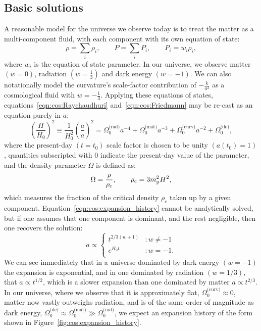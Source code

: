 \subsection{Basic solutions}
A reasonable model for the universe we observe today is to treat the matter as a multi-component fluid, with each component with its own equation of state:
\begin{equation}
  \rho = \sum_i \rho_i, \qquad P = \sum_i P_i, \qquad P_i = w_i \rho_i,
  \label{eqn:cos:multi_component}
\end{equation}
where $w_i$ is the equation of state parameter. In our universe, we observe matter $(w=0)$, radiation $(w=\frac{1}{3})$ and dark energy $(w=-1)$. We can also notationally model the curvature's scale-factor contribution of $-\frac{k}{a^2}$ as a cosmological fluid with $w=-\frac{1}{3}$. Applying these equations of states, equations~\eqref{eqn:cos:Raychaudhuri} and~\eqref{eqn:cos:Friedmann} may be re-cast as an equation purely in $a$:
\begin{equation}
  {\left( \frac{H}{H_0} \right)}^2 \equiv 
  \frac{1}{H_0^2}{\left( \frac{\dot{a}}{a} \right)}^2 =
  \Omega^\text{(rad)}_0 a^{-4} +
  \Omega^\text{(mat)}_0 a^{-3} + 
  \Omega^\text{(curv)}_0 a^{-2} +
  \Omega^\text{(de)}_0,
  \label{eqn:cos:expansion_history}
\end{equation}
where the present-day $(t=t_0)$ scale factor is chosen to be unity $(a(t_0)=1)$, quantities subscripted with $0$ indicate the present-day  value of the parameter, and the density parameter $\Omega$ is defined as:
\begin{equation}
  \Omega = \frac{\rho}{\rho_\mathrm{c}}, \qquad \rho_\mathrm{c} = {3m_{\mathrm{p}}^2H^2},
  \label{eqn:cos:omega_def}
\end{equation}
which measures the fraction of the critical density $\rho_c$ taken up by a given component. Equation~\eqref{eqn:cos:expansion_history} cannot be analytically solved, but if one assumes that one component is dominant, and the rest negligible, then one recovers the solution:
\begin{equation}
  a  \propto
  \left\{
  \begin{array}{ll}
    t^{2/3(w+1)} &: w\ne-1\\
    e^{H_0 t} &: w=-1.\\
  \end{array}
  \right.
\end{equation}
We can see immediately that in a universe dominated by dark energy $(w=-1)$ the expansion is exponential, and in one dominated by radiation $(w=1/3)$, that $a\propto t^{1/2}$, which is a slower expansion than one dominated by matter $a\propto t^{2/3}$. In our universe, where we observe that it is approximately flat, $\Omega_0^{\text{(curv)}}\approx0$, matter now vastly outweighs radiation, and is of the same order of magnitude as dark energy, ${\Omega_0^{\text{(de)}} \approx \Omega_0^{\text{(mat)}} \gg \Omega_0^{\text{(rad)}}}$, we expect an expansion history of the form shown in Figure~\ref{fig:cos:expansion_history}.

